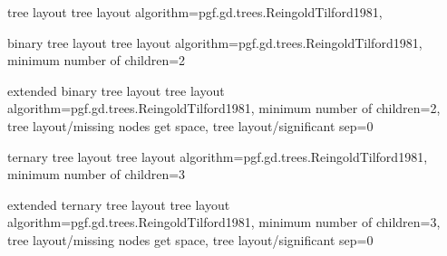 %
%
\pgfgddeclarealgorithmkey
  {tree layout}
  {tree layout}
  {
    algorithm=pgf.gd.trees.ReingoldTilford1981,
  }

%
%
\pgfgddeclarealgorithmkey
  {binary tree layout}
  {tree layout}
  {
    algorithm=pgf.gd.trees.ReingoldTilford1981,
    minimum number of children=2
  }

%
%
\pgfgddeclarealgorithmkey
  {extended binary tree layout}
  {tree layout}
  {
    algorithm=pgf.gd.trees.ReingoldTilford1981,
    minimum number of children=2,
    tree layout/missing nodes get space,
    tree layout/significant sep=0
  }

%
%
\pgfgddeclarealgorithmkey
  {ternary tree layout}
  {tree layout}
  {
    algorithm=pgf.gd.trees.ReingoldTilford1981,
    minimum number of children=3
  }

%
%
\pgfgddeclarealgorithmkey
  {extended ternary tree layout}
  {tree layout}
  {
    algorithm=pgf.gd.trees.ReingoldTilford1981,
    minimum number of children=3,
    tree layout/missing nodes get space,
    tree layout/significant sep=0
  }





\endinput
